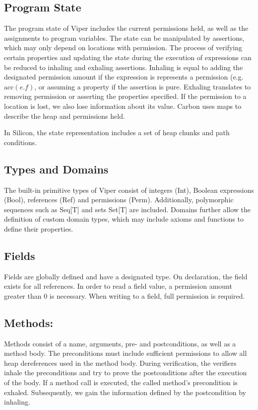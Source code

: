 \documentclass[12pt]{article}
\begin{document}
\subsection{Program State}
The program state of Viper includes the current permissions held, as well as the assignments to program variables. The state can be manipulated by assertions, which may only depend on locations with permission. The process of verifying certain properties and updating the state during the execution of expressions can be reduced to inhaling and exhaling assertions. Inhaling is equal to adding the designated permission amount if the expression is represents a permission (e.g. acc\((e.f)\), or assuming a property if the assertion is pure. Exhaling translates to removing permission or asserting the properties specified. If the permission to a location is lost, we also lose information about its value.
Carbon uses maps to describe the heap and permissions held. 

In Silicon, the state representation includes a set of heap chunks and path conditions.

\subsection{Types and Domains}
The built-in primitive types of Viper consist of integers (Int), Boolean expressions (Bool), references (Ref) and permissions (Perm). Additionally,  polymorphic sequences such as Seq[T] and sets Set[T] are included. Domains further allow the definition of custom domain types, which may include axioms and functions to define their properties.

\subsection{Fields}
Fields are globally defined and have a designated type. On declaration, the field exists for all references. In order to read a field value, a permission amount greater than 0 is necessary. When writing to a field, full permission is required.

\subsection{Methods: }
Methods consist of a name, arguments, pre- and postconditions, as well as a method body. The preconditions must include sufficient permissions to allow all heap dereferences used in the method body. During verification, the verifiers inhale the preconditions and try to prove the postconditions after the execution of the body. If a method call is executed, the called method's precondition is exhaled. Subsequently, we gain the information defined by the postcondition by inhaling.
\end{document}
